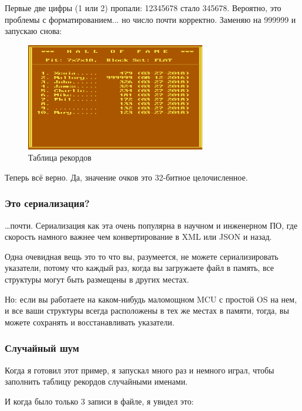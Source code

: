 Первые две цифры (1 или 2) пропали: 12345678 стало 345678. Вероятно, это проблемы с форматированием... но число почти корректно.
Заменяю на 999999 и запускаю снова:

\begin{figure}[H]
\centering
\includegraphics[width=0.7\textwidth]{advanced/550_more_structs/blockout/hs999999.png}
\caption{Таблица рекордов}
\end{figure}

Теперь всё верно. Да, значение очков это 32-битное целочисленное.

\subsubsection{Это сериализация?}

\dots почти.
Сериализация как эта очень популярна в научном и инженерном ПО, где скорость намного важнее чем конвертирование в
\ac{XML} или \ac{JSON} и назад.

Одна очевидная вещь это то что вы, разумеется, не можете сериализировать указатели, потому что каждый раз, когда вы загружаете
файл в память, все структуры могут быть размещены в других местах.

Но: если вы работаете на каком-нибудь маломощном \ac{MCU} с простой \ac{OS} на нем,
и все ваши структуры всегда расположены в тех же местах в памяти, тогда, вы можете сохранять и восстанавливать указатели.

\subsubsection{Случайный шум}

Когда я готовил этот пример, я запускал  много раз и немного играл, чтобы заполнить таблицу рекордов
случайными именами.

И когда было только 3 записи в файле, я увидел это:

